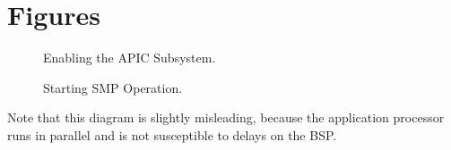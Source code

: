 \chapter{Figures}
\label{ch:figures}

\clearpage

\begin{figure}[H]
    \centering
    \begin{subfigure}[b]{0.85\textwidth}
        
    \end{subfigure}
    \caption{Enabling the APIC Subsystem.}
    \label{fig:apicenable}
\end{figure}

\begin{figure}[H]
    \centering
    \begin{subfigure}[b]{0.85\textwidth}
        
    \end{subfigure}
    \caption{Starting SMP Operation.}
    \label{fig:smpenable}
\end{figure}

Note that this diagram is slightly misleading, because the application processor runs in parallel and is not susceptible to delays on the BSP\@.

\cleardoublepage